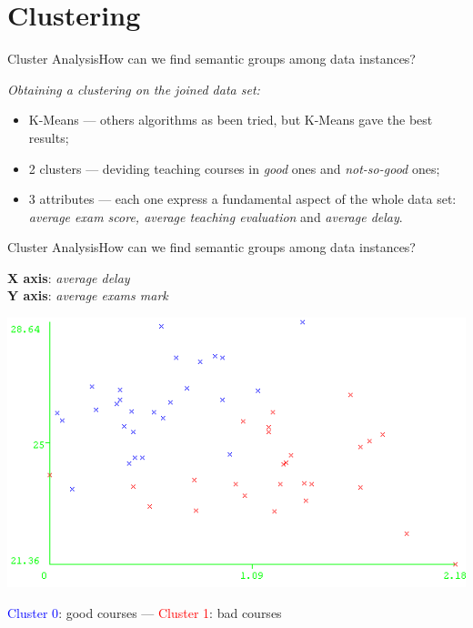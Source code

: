\section{Clustering}

\begin{frame}{Cluster Analysis}{How can we find semantic groups among data instances?}

 \centering\textit{Obtaining a clustering on the joined data set:} \vspace{0,3cm}

	\begin{block}{}
		\begin{itemize}
			\item<1-> \alert{K-Means} --- others algorithms as been tried, but K-Means gave the best results;
			\item<2-> \alert{2 clusters} --- deviding teaching courses in \emph{good} ones and \emph{not-so-good} ones;
			\item<3-> \alert{3 attributes} --- each one express a fundamental aspect of the whole data set: \emph{average exam score, average teaching evaluation} and \emph{average delay}.
		\end{itemize}
	\end{block}

\end{frame}

\begin{frame}{Cluster Analysis}{How can we find semantic groups among data instances?}

    \textbf{X axis}: \emph{average delay} \\ \textbf{Y axis}: \emph{average exams mark}

    \vspace{0.1cm}
    \begin{centering}
        \hspace{0.5cm}\includegraphics[scale=0.46]{cluster1.png}
    \end{centering}

    \textcolor{blue}{Cluster 0}: good courses --- \textcolor{red}{Cluster 1}: bad courses

\end{frame}

